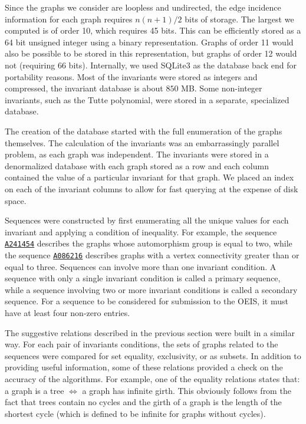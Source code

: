 \documentclass[12pt]{article}
\newcommand{\OEIS}[1]
{\href{https://oeis.org/#1}{\texttt{#1}}}
\begin{document}
Since the graphs we consider are loopless and undirected, the edge incidence information for each graph requires $n(n+1)/2$ bits of storage.
The largest we computed is of order 10, which requires 45 bits. 
This can be efficiently stored as a 64 bit unsigned integer using a binary representation.
Graphs of order 11 would also be possible to be stored in this representation, but graphs of order 12 would not (requiring 66 bits).
Internally, we used SQLite3 as the database back end for portability reasons.
Most of the invariants were stored as integers and compressed, the invariant database is about $850$ MB.
Some non-integer invariants, such as the Tutte polynomial, were stored in a separate, specialized database.

The creation of the database started with the full enumeration of the graphs themselves.
The calculation of the invariants was an embarrassingly parallel problem, as each graph was independent.
The invariants were stored in a denormalized database with each graph stored as a row and each column contained the value of a particular invariant for that graph. 
We placed an index on each of the invariant columns to allow for fast querying at the expense of disk space.

Sequences were constructed by first enumerating all the unique values for each invariant and applying a condition of inequality. 
For example, the sequence \OEIS{A241454} describes the graphs whose automorphism group is equal to two, while the sequence \OEIS{A086216} describes graphs with a vertex connectivity greater than or equal to three. 
Sequences can involve more than one invariant condition.
A sequence with only a single invariant condition is called a primary sequence, while a sequence involving two or more invariant conditions is called a secondary sequence.
For a sequence to be considered for submission to the OEIS, it must have at least four non-zero entries. 

The suggestive relations described in the previous section were built in a similar way.
For each pair of invariants conditions, the sets of graphs related to the sequences were compared for set equality, exclusivity, or as subsets.
In addition to providing useful information, some of these relations provided a check on the accuracy of the algorithms.
For example, one of the equality relations states that: a graph is a tree $\Leftrightarrow$ a graph has infinite girth.
This obviously follows from the fact that trees contain no cycles and the girth of a graph is the length of the shortest cycle (which is defined to be infinite for graphs without cycles). 
\end{document}
